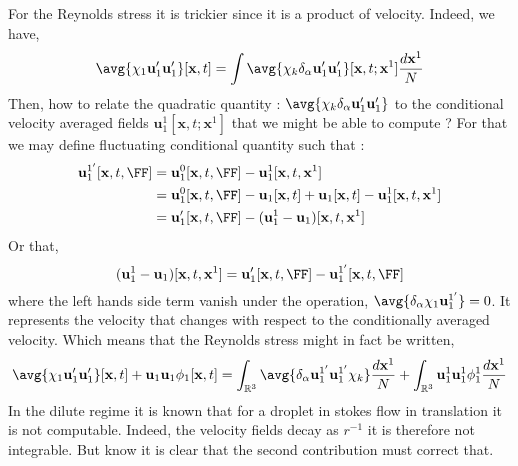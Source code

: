 For the Reynolds stress it is trickier since it is a product of velocity. 
Indeed, we have,
\begin{align*}
    \avg{\chi_1 \textbf{u}_1'\textbf{u}_1'}[\textbf{x},t]
    =
    \int \avg{\chi_k \delta_\alpha  \textbf{u}_1'\textbf{u}_1'}[\textbf{x},t;\textbf{x}^1]
    \frac{d\textbf{x}^1}{N}
\end{align*}
Then, how to relate the quadratic quantity : $\avg{\chi_k \delta_\alpha  \textbf{u}_1'\textbf{u}_1'}$ to the conditional velocity averaged fields $\textbf{u}^1_1[\textbf{x},t;\textbf{x}^1]$  that we might be able to compute ? 
For that we may define fluctuating conditional quantity such that : 
\begin{align*}
    \textbf{u}_1^{1'}[\textbf{x},t,\FF]
    &= 
    \textbf{u}_1^0[\textbf{x},t,\FF]
    - \textbf{u}_1^1[\textbf{x},t,\textbf{x}^1]\\
    &= 
    \textbf{u}_1^0[\textbf{x},t,\FF]
    - \textbf{u}_1[\textbf{x},t]
    + \textbf{u}_1[\textbf{x},t]
    - \textbf{u}_1^1[\textbf{x},t,\textbf{x}^1]\\
    &= 
    \textbf{u}_1'[\textbf{x},t,\FF]
    - (\textbf{u}_1^1-\textbf{u}_1)[\textbf{x},t,\textbf{x}^1]
\end{align*}
Or that, 
\begin{equation*}
    (\textbf{u}_1^1-\textbf{u}_1)[\textbf{x},t,\textbf{x}^1]
    = 
    \textbf{u}_1'[\textbf{x},t,\FF]
     -\textbf{u}_1^{1'}[\textbf{x},t,\FF]
\end{equation*}
where the left hands side term vanish under the operation, $\avg{\delta_\alpha \chi_1 \textbf{u}_1^{1'}} = 0$.
It represents the velocity that changes with respect to the conditionally averaged velocity. 
Which means that the Reynolds stress might in fact be written, 
\begin{align*}
    \avg{\chi_1 \textbf{u}_1'\textbf{u}_1'}[\textbf{x},t]
    + \textbf{u}_1\textbf{u}_1
    \phi_1[\textbf{x},t]
    =
    \int_{\mathbb{R}^3}
    \avg{\delta_\alpha 
    \textbf{u}_1^{1'}
    \textbf{u}_1^{1'}
    \chi_k} \frac{d\textbf{x}^1}{N}
    +
    \int_{\mathbb{R}^3} 
    \textbf{u}_1^1\textbf{u}_1^1
    \phi_1^1
    \frac{d\textbf{x}^1}{N}
\end{align*}
In the dilute regime it is known that for a droplet in stokes flow in translation it is not computable. 
Indeed, the velocity fields decay as $r^{-1}$ it is therefore not integrable. 
But know it is clear that the second contribution must correct that. 

